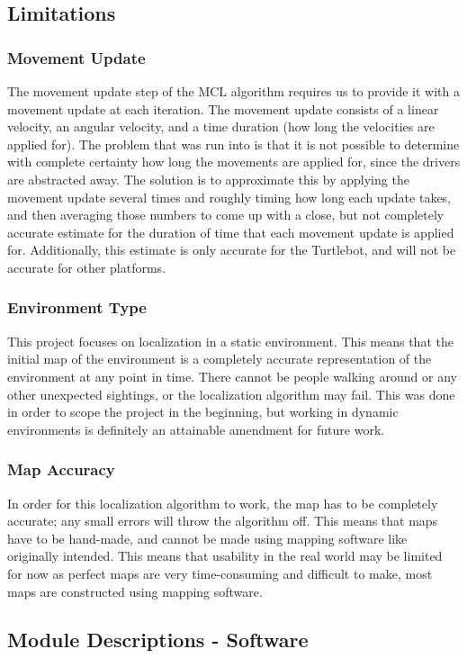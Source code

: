 \documentclass{article}
\newcommand\tab[1][0.5cm]{\hspace*{#1}}
\begin{document}
\subsection{Limitations}
\subsubsection{Movement Update}
\tab The movement update step of the MCL algorithm requires us to provide it with a movement update at each iteration. The movement update consists of a linear velocity, an angular velocity, and a time duration (how long the velocities are applied for). The problem that was run into is that it is not possible to determine with complete certainty how long the movements are applied for, since the drivers are abstracted away. The solution is to approximate this by applying the movement update several times and roughly timing how long each update takes, and then averaging those numbers to come up with a close, but not completely accurate estimate for the duration of time that each movement update is applied for. Additionally, this estimate is only accurate for the Turtlebot, and will not be accurate for other platforms.
\subsubsection{Environment Type}
\tab This project focuses on localization in a static environment. This means that the initial map of the environment is a completely accurate representation of the environment at any point in time. There cannot be people walking around or any other unexpected sightings, or the localization algorithm may fail. This was done in order to scope the project in the beginning, but working in dynamic environments is definitely an attainable amendment for future work.
\subsubsection{Map Accuracy}
\tab In order for this localization algorithm to work, the map has to be completely accurate; any small errors will throw the algorithm off. This means that maps have to be hand-made, and cannot be made using mapping software like originally intended.  This means that usability in the real world may be limited for now as perfect maps are very time-consuming and difficult to make, most maps are constructed using mapping software.
\subsection{Module Descriptions - Software}
\end{document}
